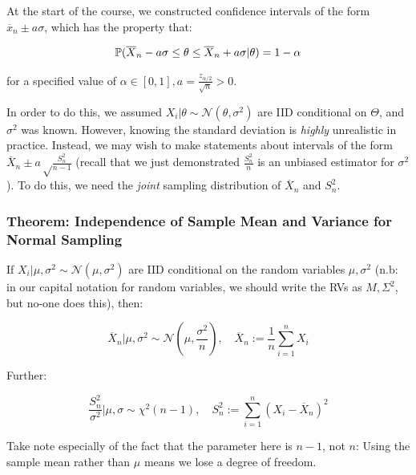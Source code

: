 \documentclass[a4paper]{article}
\begin{document}
            At the start of the course, we constructed confidence intervals of
            the form $\overline x_n \pm a\sigma$, which has the property that:

            \[
                \mathbb{P}(\overline X_n - a\sigma \leq \theta \leq \overline X_n +
                a\sigma | \theta) = 1 - \alpha
            \]

            for a specified value of $\alpha \in [0, 1], a =
            \frac{z_{\alpha/2}}{\sqrt{n}} > 0$.

            In order to do this, we assumed $X_i | \theta \sim
            \mathcal{N}(\theta, \sigma^2)$ are IID conditional on $\Theta$, and
            $\sigma^2$ was known. However, knowing the standard deviation is
            \textit{highly} unrealistic in practice. Instead, we may wish to
            make statements about intervals of the form $\overline X_n \pm a
            \sqrt\frac{S_n^2}{n - 1}$ (recall that we just demonstrated
            $\frac{S_n^2}{n}$ is an unbiased estimator for $\sigma^2$). To do
            this, we need the \textit{joint} sampling distribution of $\overline
            X_n$ and $S_n^2$.

            \subsubsection{Theorem: Independence of Sample Mean and Variance for
            Normal Sampling}
                If $X_i | \mu, \sigma^2 \sim \mathcal{N}(\mu, \sigma^2)$ are IID
                conditional on the random variables $\mu, \sigma^2$ (n.b: in our
                capital notation for random variables, we should write the RVs
                as $M, \Sigma^2$, but no-one does this), then:

                \[
                    \overline X_n | \mu, \sigma^2 \sim \mathcal{N}(\mu,
                    \frac{\sigma^2}{n}), \quad \overline X_n := \frac{1}{n}
                    \sum_{i=1}^n X_i
                \]

                Further:

                \[
                    \frac{S_n^2}{\sigma^2} | \mu, \sigma \sim \chi^2(n - 1),
                    \quad S_n^2 := \sum_{i=1}^n (X_i - \overline X_n)^2
                \]

                \begin{warn}
                    Take note especially of the fact that the parameter here
                    is $n - 1$, not $n$: Using the sample mean rather than $\mu$
                    means we lose a degree of freedom.
                \end{warn}
\end{document}
